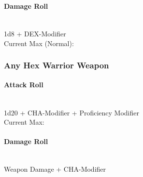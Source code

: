 {\paragraph*{Damage Roll}\hfill\\
1d8 + DEX-Modifier\\
\indent Current Max (Normal): 
\subsubsection*{Any Hex Warrior Weapon}
\paragraph*{Attack Roll}\hfill\\
1d20 + CHA-Modifier + Proficiency Modifier \\
\indent Current Max: 
\paragraph*{Damage Roll}\hfill\\
Weapon Damage + CHA-Modifier
}